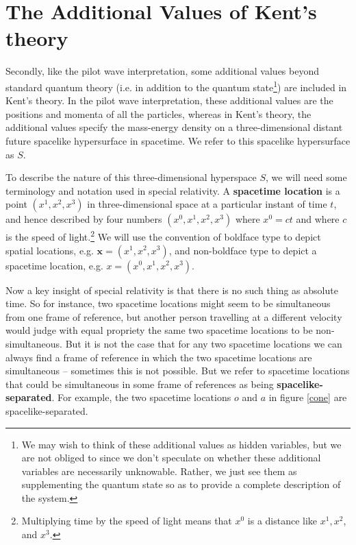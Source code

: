 \section{The Additional Values of Kent's theory\label{additional}}
Secondly, like the pilot wave interpretation, some additional values beyond standard quantum theory (i.e. in addition to the quantum state\footnote{We may wish to think of these additional values as hidden variables, but we are not obliged to since we don't speculate on whether these additional variables are necessarily unknowable. Rather, we just see them as supplementing the quantum state so as to provide a complete description of the system.}) are included in Kent's theory. In the pilot wave interpretation, these additional values are the positions and momenta of all the particles, whereas in Kent's theory, the additional values specify the mass-energy density on a three-dimensional distant future spacelike hypersurface in spacetime. We refer to this spacelike hypersurface as $S$. 

To describe the nature of this three-dimensional hyperspace $S$, we will need some terminology and notation used in special relativity. A \textbf{spacetime location} is a point $(x^1,x^2,x^3)$ in three-dimensional space at a particular instant of time $t$, and hence described by four numbers $(x^0,x^1,x^2,x^3)$ where $x^0=c t$ and where $c$ is the speed of light.\footnote{Multiplying time by the speed of light means that $x^0$ is a distance like $x^1,x^2$, and $x^3$. } We will use the convention of boldface type to depict spatial locations, e.g. $\bm{x}=(x^1,x^2,x^3)$, and non-boldface type to depict a spacetime location, e.g. $x=(x^0,x^1,x^2,x^3)$. 

Now a key insight of special relativity is that there is no such thing as absolute time. So for instance, two spacetime locations might seem to be simultaneous from one frame of reference, but another person travelling at a different velocity would judge with equal propriety the same two spacetime locations to be non-simultaneous. But it is not the case that for any two spacetime locations we can always find a frame of reference in which the two spacetime locations are simultaneous -- sometimes this is not possible. But we refer to spacetime locations that could be simultaneous in some frame of references as being \textbf{spacelike-separated}. For example, the two spacetime locations $o$ and $a           $  in figure \ref{cone} are spacelike-separated. 

